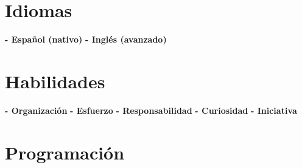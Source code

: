 \documentclass[]{friggeri-cv}
\begin{document}
\begin{aside}
  \section{Idiomas}
    \textbf{- Español (nativo)}
    \textbf{- Inglés (avanzado)}
    ~       
  \section{Habilidades}
    \textbf{- Organización}
    \textbf{- Esfuerzo}
    \textbf{- Responsabilidad}
    \textbf{- Curiosidad}
    \textbf{- Iniciativa}
    ~ 
  \section{Programación}
    ~    
\end{aside}
~
\\ [0.8cm]
\end{document}
